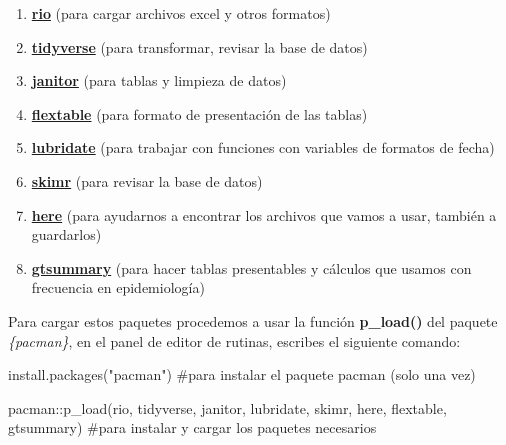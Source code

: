 \documentclass[
  letterpaper,
  DIV=11,
  numbers=noendperiod]{scrreprt}
\newenvironment{Shaded}{\begin{snugshade}}{\end{snugshade}}
\newcommand{\CommentTok}[1]{\textcolor[rgb]{0.37,0.37,0.37}{#1}}
\newcommand{\FunctionTok}[1]{\textcolor[rgb]{0.28,0.35,0.67}{#1}}
\newcommand{\NormalTok}[1]{\textcolor[rgb]{0.00,0.23,0.31}{#1}}
\newcommand{\SpecialCharTok}[1]{\textcolor[rgb]{0.37,0.37,0.37}{#1}}
\newcommand{\StringTok}[1]{\textcolor[rgb]{0.13,0.47,0.30}{#1}}
\begin{document}
\begin{enumerate}
\def\labelenumi{\arabic{enumi}.}
\item
  \href{https://cran.r-project.org/web/packages/rio/vignettes/rio.html}{\textbf{rio}}
  (para cargar archivos excel y otros formatos)
\item
  \href{https://cran.r-project.org/web/packages/tidyverse/vignettes/paper.html}{\textbf{tidyverse}}
  (para transformar, revisar la base de datos)
\item
  \href{https://cran.r-project.org/web/packages/janitor/vignettes/janitor.html}{\textbf{janitor}}
  (para tablas y limpieza de datos)
\item
  \href{https://cran.r-project.org/web/packages/flextable/index.html}{\textbf{flextable}}
  (para formato de presentación de las tablas)
\item
  \href{https://cran.r-project.org/web/packages/lubridate/vignettes/lubridate.html}{\textbf{lubridate}}
  (para trabajar con funciones con variables de formatos de fecha)
\item
  \href{https://cran.r-project.org/web/packages/skimr/vignettes/skimr.html}{\textbf{skimr}}
  (para revisar la base de datos)
\item
  \href{https://cran.r-project.org/web/packages/here/vignettes/here.html}{\textbf{here}}
  (para ayudarnos a encontrar los archivos que vamos a usar, también a
  guardarlos)
\item
  \href{https://www.danieldsjoberg.com/gtsummary/}{\textbf{gtsummary}}
  (para hacer tablas presentables y cálculos que usamos con frecuencia
  en epidemiología)
\end{enumerate}

Para cargar estos paquetes procedemos a usar la función
\textbf{p\_load()} del paquete \emph{\{pacman\}}, en el panel de editor
de rutinas, escribes el siguiente comando:

\begin{Shaded}
\begin{Highlighting}[]
\FunctionTok{install.packages}\NormalTok{(}\StringTok{"pacman"}\NormalTok{) }\CommentTok{\#para instalar el paquete pacman (solo una vez)}
\end{Highlighting}
\end{Shaded}

\begin{Shaded}
\begin{Highlighting}[]
\NormalTok{pacman}\SpecialCharTok{::}\FunctionTok{p\_load}\NormalTok{(rio, }
\NormalTok{               tidyverse, }
\NormalTok{               janitor, }
\NormalTok{               lubridate, }
\NormalTok{               skimr, }
\NormalTok{               here,}
\NormalTok{               flextable,}
\NormalTok{               gtsummary) }\CommentTok{\#para instalar y cargar los paquetes necesarios}
\end{Highlighting}
\end{Shaded}
\end{document}
